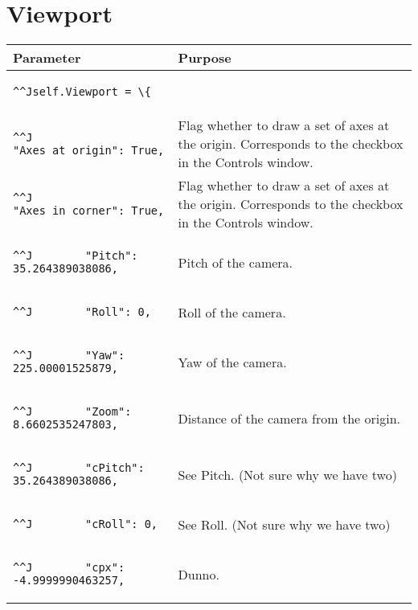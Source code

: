 \documentclass[12pt,a4paper,openany,oneside,oldfontcommands]{memoir}
\begin{document}
\section{Viewport}	
\begin{tabularx}{\textwidth}{p{8cm} X}
	\toprule
	\textbf{Parameter}                              & \textbf{Purpose} \\
	\midrule
	\endhead
\begin{lstlisting}^^Jself.Viewport = \{\end{lstlisting}    & \\
\begin{lstlisting}^^J        "Axes_at_origin": True,\end{lstlisting}    & Flag whether to draw a set of axes at the origin. Corresponds to the checkbox in the Controls window. \\
\begin{lstlisting}^^J        "Axes_in_corner": True,\end{lstlisting}    & Flag whether to draw a set of axes at the origin. Corresponds to the checkbox in the Controls window.\\
\begin{lstlisting}^^J        "Pitch": 35.264389038086,\end{lstlisting}    & Pitch of the camera.\\
\begin{lstlisting}^^J        "Roll": 0,\end{lstlisting}    & Roll of the camera.\\
\begin{lstlisting}^^J        "Yaw": 225.00001525879,\end{lstlisting}    & Yaw of the camera.\\
\begin{lstlisting}^^J        "Zoom": 8.6602535247803,\end{lstlisting}    & Distance of the camera from the origin.\\
\begin{lstlisting}^^J        "cPitch": 35.264389038086,\end{lstlisting}    & See Pitch. (Not sure why we have two)\\
\begin{lstlisting}^^J        "cRoll": 0,\end{lstlisting}    & See Roll. (Not sure why we have two)\\
\begin{lstlisting}^^J        "cpx": -4.9999990463257,\end{lstlisting}    & Dunno. \\

\end{tabularx}
\end{document}
